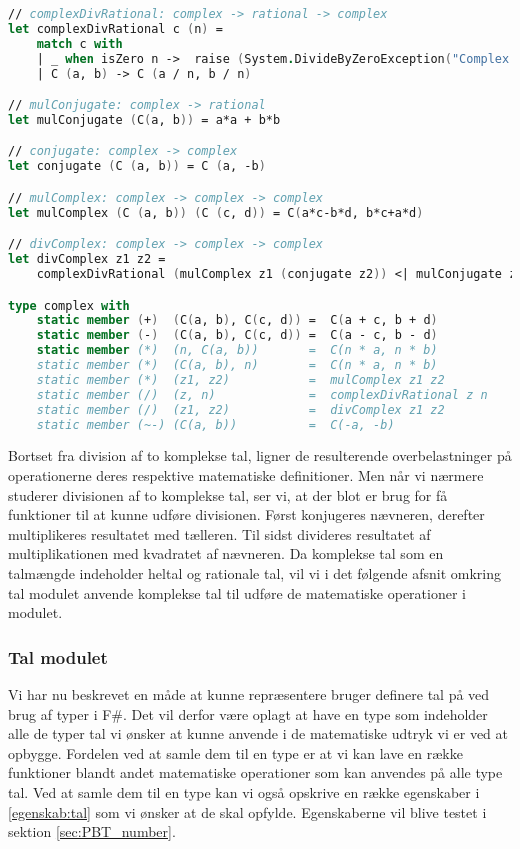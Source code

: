 \begin{lstlisting}[language={FSharp}, 
    label={complex_operations},
    caption={Overskrivning af operationer på komplekse tal}]
// complexDivRational: complex -> rational -> complex
let complexDivRational c (n) = 
    match c with
    | _ when isZero n ->  raise (System.DivideByZeroException("Complex.divRational: Cannot divide by zero!"))
    | C (a, b) -> C (a / n, b / n) 

// mulConjugate: complex -> rational
let mulConjugate (C(a, b)) = a*a + b*b

// conjugate: complex -> complex
let conjugate (C (a, b)) = C (a, -b)

// mulComplex: complex -> complex -> complex
let mulComplex (C (a, b)) (C (c, d)) = C(a*c-b*d, b*c+a*d)

// divComplex: complex -> complex -> complex
let divComplex z1 z2 =
    complexDivRational (mulComplex z1 (conjugate z2)) <| mulConjugate z2

type complex with
    static member (+)  (C(a, b), C(c, d)) =  C(a + c, b + d)
    static member (-)  (C(a, b), C(c, d)) =  C(a - c, b - d)
    static member (*)  (n, C(a, b))       =  C(n * a, n * b)
    static member (*)  (C(a, b), n)       =  C(n * a, n * b)
    static member (*)  (z1, z2)           =  mulComplex z1 z2
    static member (/)  (z, n)             =  complexDivRational z n
    static member (/)  (z1, z2)           =  divComplex z1 z2 
    static member (~-) (C(a, b))          =  C(-a, -b)
\end{lstlisting}    

Bortset fra division af to komplekse tal, ligner de resulterende overbelastninger på operationerne deres respektive matematiske definitioner. Men når vi nærmere studerer divisionen af to komplekse tal, ser vi, at der blot er brug for få funktioner til at kunne udføre divisionen. Først konjugeres nævneren, derefter multiplikeres resultatet med tælleren. Til sidst divideres resultatet af multiplikationen med kvadratet af nævneren. Da komplekse tal som en talmængde indeholder heltal og rationale tal, vil vi i det følgende afsnit omkring tal modulet anvende komplekse tal til udføre de matematiske operationer i modulet.


\subsubsection{Tal modulet}
Vi har nu beskrevet en måde at kunne repræsentere bruger definere tal på ved brug af typer i F\#. Det vil derfor være oplagt at have en type som indeholder alle de typer tal vi ønsker at kunne anvende i de matematiske udtryk vi er ved at opbygge. Fordelen ved at samle dem til en type er at vi kan lave en række funktioner blandt andet matematiske operationer som kan anvendes på alle type tal. Ved at samle dem til en type kan vi også opskrive en række egenskaber i \ref{egenskab:tal} som vi ønsker at de skal opfylde. Egenskaberne vil blive testet i sektion \ref{sec:PBT_number}.

